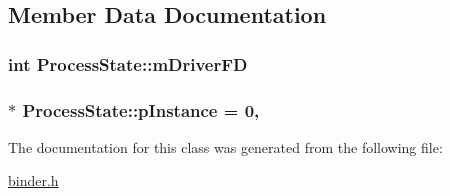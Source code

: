 \subsection{Member Data Documentation}
\hypertarget{classProcessState_a76bd74bf501a4f428eee9555d1d3c493}{
\subsubsection[{m\-Driver\-F\-D}]{\setlength{\rightskip}{0pt plus 5cm}int Process\-State\-::m\-Driver\-F\-D\hspace{0.3cm}{\ttfamily [private]}}}\label{classProcessState_a76bd74bf501a4f428eee9555d1d3c493}
\hypertarget{classProcessState_a85d9fa40156e923969fcb00ffdc3ab1a}{
\subsubsection[{p\-Instance}]{ $\ast$ Process\-State\-::p\-Instance = 0\hspace{0.3cm}{\ttfamily [static]}, {\ttfamily [private]}}}\label{classProcessState_a85d9fa40156e923969fcb00ffdc3ab1a}


The documentation for this class was generated from the following file\-:\begin{DoxyCompactItemize}
\item 
\hyperlink{binder_8h}{binder.\-h}\end{DoxyCompactItemize}
